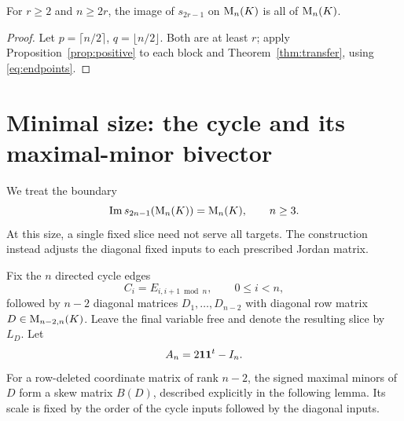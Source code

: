 \begin{corollary}\label{cor:large}
For $r\ge2$ and $n\ge2r$, the image of $s_{2r-1}$ on
$\mathrm{M}_n(K)$ is all of $\mathrm{M}_n(K)$.
\end{corollary}
\begin{proof}
Let $p=\lceil n/2\rceil$, $q=\lfloor n/2\rfloor$.
Both are at least $r$; apply Proposition~\ref{prop:positive}
to each block and Theorem~\ref{thm:transfer}, using
\eqref{eq:endpoints}.
\end{proof}

\section{Minimal size: the cycle and its maximal-minor bivector}
\label{sec:minimal}
We treat the boundary
\begin{equation}\label{eq:minimalclaim}
 \operatorname{Im} s_{2n-1}(\mathrm{M}_n(K))=\mathrm{M}_n(K),\qquad n\ge3.
\end{equation}
At this size, a single fixed slice need not serve all targets. The
construction instead adjusts the diagonal fixed inputs to each
prescribed Jordan matrix.

Fix the $n$ directed cycle edges
\[
 C_i=E_{i,i+1\bmod n},\qquad 0\le i<n,
\]
followed by $n-2$ diagonal matrices
$D_1,\ldots,D_{n-2}$ with diagonal row matrix
$D\in\mathrm{M}_{n-2,n}(K)$. Leave the final variable free and denote
the resulting slice by $L_D$. Let
\begin{equation}\label{eq:An}
 A_n=2\mathbf{1}\mathbf{1}^t-I_n.
\end{equation}
For a row-deleted coordinate matrix of rank $n-2$, the signed
maximal minors of $D$ form a skew matrix $B(D)$, described
explicitly in the following lemma. Its scale is fixed by the
order of the cycle inputs followed by the diagonal inputs.

